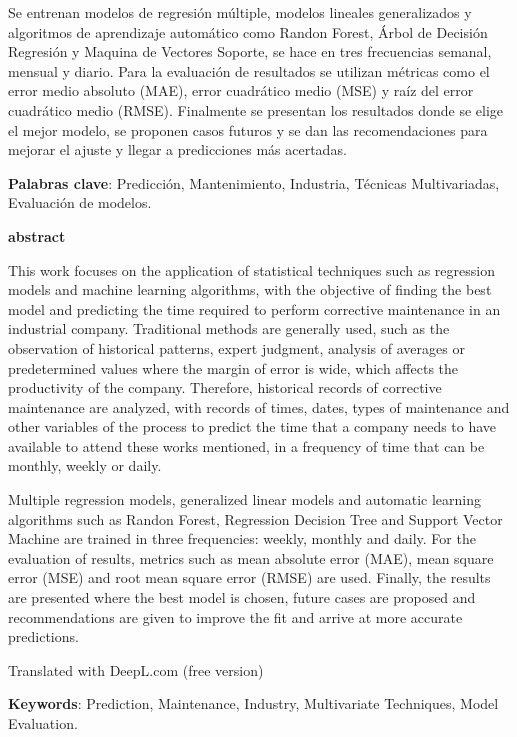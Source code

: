 \documentclass[
  11pt,
  bookmarksnumbered]{article}
\begin{document}
Se entrenan modelos de regresión múltiple, modelos lineales generalizados y algoritmos de aprendizaje automático como Randon Forest, Árbol de Decisión Regresión y Maquina de Vectores Soporte, se hace en tres frecuencias semanal, mensual y diario.
Para la evaluación de resultados se utilizan métricas como el error medio absoluto (MAE), error cuadrático medio (MSE) y raíz del error cuadrático medio (RMSE).
Finalmente se presentan los resultados donde se elige el mejor modelo, se proponen casos futuros y se dan las recomendaciones para mejorar el ajuste y llegar a predicciones más acertadas.

\textbf{Palabras clave}: Predicción, Mantenimiento, Industria, Técnicas Multivariadas, Evaluación de modelos.

\newpage

\begin{center}
\textbf{abstract}
\end{center}

This work focuses on the application of statistical techniques such as regression models and machine learning algorithms, with the objective of finding the best model and predicting the time required to perform corrective maintenance in an industrial company.
Traditional methods are generally used, such as the observation of historical patterns, expert judgment, analysis of averages or predetermined values where the margin of error is wide, which affects the productivity of the company.
Therefore, historical records of corrective maintenance are analyzed, with records of times, dates, types of maintenance and other variables of the process to predict the time that a company needs to have available to attend these works mentioned, in a frequency of time that can be monthly, weekly or daily.

Multiple regression models, generalized linear models and automatic learning algorithms such as Randon Forest, Regression Decision Tree and Support Vector Machine are trained in three frequencies: weekly, monthly and daily.
For the evaluation of results, metrics such as mean absolute error (MAE), mean square error (MSE) and root mean square error (RMSE) are used.
Finally, the results are presented where the best model is chosen, future cases are proposed and recommendations are given to improve the fit and arrive at more accurate predictions.

Translated with DeepL.com (free version)

\textbf{Keywords}: Prediction, Maintenance, Industry, Multivariate Techniques, Model Evaluation.
\end{document}
